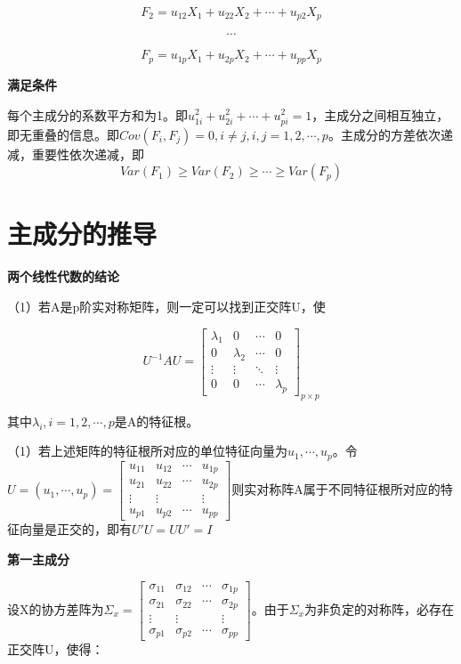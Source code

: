 \documentclass[]{ctexbook}
\begin{document}
\[F_2=u_{12}X_1+u_{22}X_2+\cdots+u_{p2}X_p\]

\[\cdots\]

\[F_p=u_{1p}X_1+u_{2p}X_2+\cdots+u_{pp}X_p\]

\textbf{满足条件}

每个主成分的系数平方和为1。即\(u_{1i}^2+u_{2i}^2+\cdots+u_{pi}^2=1\)，主成分之间相互独立，即无重叠的信息。即\(Cov(F_i,F_j)=0,i\neq j,i,j=1,2,\cdots,p\)。主成分的方差依次递减，重要性依次递减，即\[Var(F_1)\ge Var(F_2)\ge \cdots \ge Var(F_p)\]

\hypertarget{ux4e3bux6210ux5206ux7684ux63a8ux5bfc}{%
\section{主成分的推导}\label{ux4e3bux6210ux5206ux7684ux63a8ux5bfc}}

\textbf{两个线性代数的结论}

（1）若A是p阶实对称矩阵，则一定可以找到正交阵U，使

\[U^{-1}AU=\begin{bmatrix} \lambda_1 & 0 & \cdots & 0 \\ 0 & \lambda_2 & \cdots & 0 \\ \vdots & \vdots & \ddots & \vdots \\ 0 & 0 & \cdots & \lambda_p \end{bmatrix}_{p\times p}\]

其中\(\lambda_i,i=1,2,\cdots,p\)是A的特征根。

（1）若上述矩阵的特征根所对应的单位特征向量为\(u_1,\cdots,u_p\)。令\(U=(u_1,\cdots,u_p)=\begin {bmatrix} u_{11} & u_{12} & \cdots & u_{1p} \\ u_{21} & u_{22} & \cdots & u_{2p} \\ \vdots & \vdots & & \vdots \\ u_{p1} & u_{p2} & \cdots & u_{pp} \end {bmatrix}\)则实对称阵A属于不同特征根所对应的特征向量是正交的，即有\(U'U=UU'=I\)

\textbf{第一主成分}

设X的协方差阵为\(\Sigma_x=\begin {bmatrix} \sigma_{11} & \sigma_{12} & \cdots & \sigma_{1p} \\ \sigma_{21} & \sigma_{22} & \cdots & \sigma_{2p} \\ \vdots & \vdots & & \vdots \\ \sigma_{p1} & \sigma_{p2} & \cdots & \sigma_{pp} \end {bmatrix}\)。由于\(\Sigma_x\)为非负定的对称阵，必存在正交阵U，使得：
\end{document}
